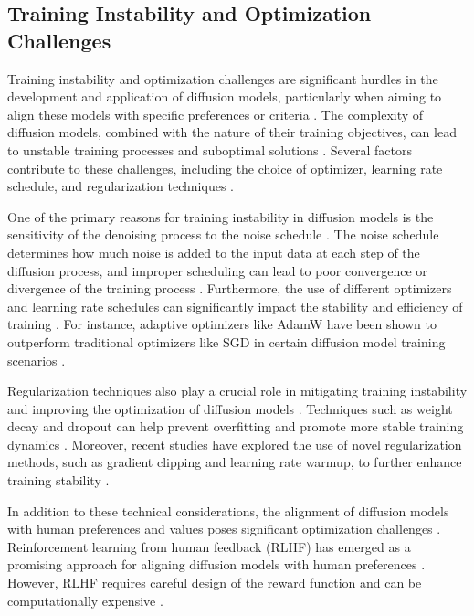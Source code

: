 \documentclass[11pt,a4paper]{article}
\begin{document}
\subsection{Training Instability and Optimization Challenges}


Training instability and optimization challenges are significant hurdles in the development and application of diffusion models, particularly when aiming to align these models with specific preferences or criteria \cite{doi:10.1145/3626235}. The complexity of diffusion models, combined with the nature of their training objectives, can lead to unstable training processes and suboptimal solutions \cite{arxiv:2306.04542}. Several factors contribute to these challenges, including the choice of optimizer, learning rate schedule, and regularization techniques \cite{arxiv:2502.06805}.

One of the primary reasons for training instability in diffusion models is the sensitivity of the denoising process to the noise schedule \cite{arxiv:2402.07487}. The noise schedule determines how much noise is added to the input data at each step of the diffusion process, and improper scheduling can lead to poor convergence or divergence of the training process \cite{doi:10.3758/s13428-020-01366-8}. Furthermore, the use of different optimizers and learning rate schedules can significantly impact the stability and efficiency of training \cite{arxiv:2502.11420}. For instance, adaptive optimizers like AdamW have been shown to outperform traditional optimizers like SGD in certain diffusion model training scenarios \cite{doi:10.1109/tkde.2024.3361474}.

Regularization techniques also play a crucial role in mitigating training instability and improving the optimization of diffusion models \cite{arxiv:2207.12598}. Techniques such as weight decay and dropout can help prevent overfitting and promote more stable training dynamics \cite{doi:10.1109/cvpr52729.2023.02154}. Moreover, recent studies have explored the use of novel regularization methods, such as gradient clipping and learning rate warmup, to further enhance training stability \cite{arxiv:2407.01392}.

In addition to these technical considerations, the alignment of diffusion models with human preferences and values poses significant optimization challenges \cite{doi:10.1093/nsr/nwae348}. Reinforcement learning from human feedback (RLHF) has emerged as a promising approach for aligning diffusion models with human preferences \cite{arxiv:2305.13301}. However, RLHF requires careful design of the reward function and can be computationally expensive \cite{arxiv:2401.12244}.
\end{document}
